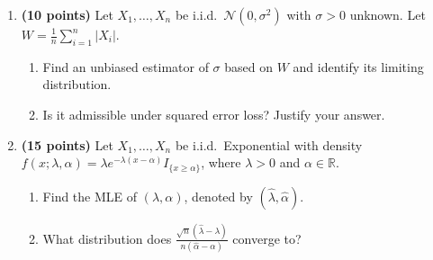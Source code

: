 \documentclass[11pt,a4paper]{article}
\begin{document}
\begin{enumerate}[label=\textbf{\arabic*.}]
    \item \textbf{(10 points)} Let $X_1, \dots, X_n$ be i.i.d.\ $\mathcal{N}(0, \sigma^2)$ with $\sigma > 0$ unknown. Let $W = \frac{1}{n} \sum_{i=1}^n |X_i|$.
    \begin{enumerate}[label=(\alph*)]
        \item Find an unbiased estimator of $\sigma$ based on $W$ and identify its limiting distribution.
        \item Is it admissible under squared error loss? Justify your answer.
    \end{enumerate}

    \item \textbf{(15 points)} Let $X_1, \dots, X_n$ be i.i.d.\ Exponential with density $f(x; \lambda, \alpha) = \lambda e^{-\lambda(x - \alpha)} I_{\{x \ge \alpha\}}$, where $\lambda > 0$ and $\alpha \in \mathbb{R}$.
    \begin{enumerate}[label=(\alph*)]
        \item Find the MLE of $(\lambda, \alpha)$, denoted by $(\hat{\lambda}, \hat{\alpha})$.
        \item What distribution does $\frac{\sqrt{n}(\hat{\lambda} - \lambda)}{n(\hat{\alpha} - \alpha)}$ converge to?
    \end{enumerate}
\end{enumerate}
\end{document}
